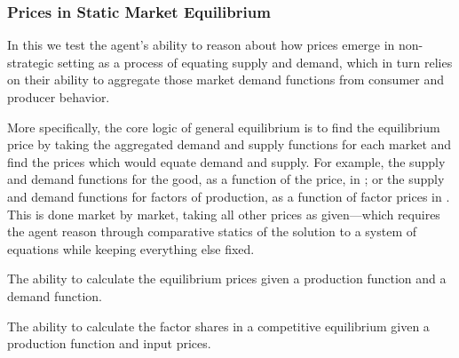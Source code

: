 

\subsubsection{Prices in Static Market Equilibrium}\label{mod:static_equilibrium}
In this \parent we test the agent's ability to reason about how prices emerge in non-strategic setting as a process of equating supply and demand, which in turn relies on their ability to aggregate those market demand functions from consumer and producer behavior.

More specifically, the core logic of general equilibrium is to find the equilibrium price by taking the aggregated demand and supply functions for each market  and find the prices which would equate demand and supply.  For example, the supply and demand functions for the good, as a function of the price, in ; or the supply and demand functions for factors of production, as a function of factor prices in .  This is done market by market, taking all other prices as given---which requires the agent reason through comparative statics of the solution to a system of equations while keeping everything else fixed.

\begin{el}\label{el:find_eq_price}
    {The ability to calculate the equilibrium prices given a production function and a demand function.}
\end{el}



\begin{el}
    {The ability to calculate the factor shares in a competitive equilibrium given a production function and input prices.}
\end{el}


